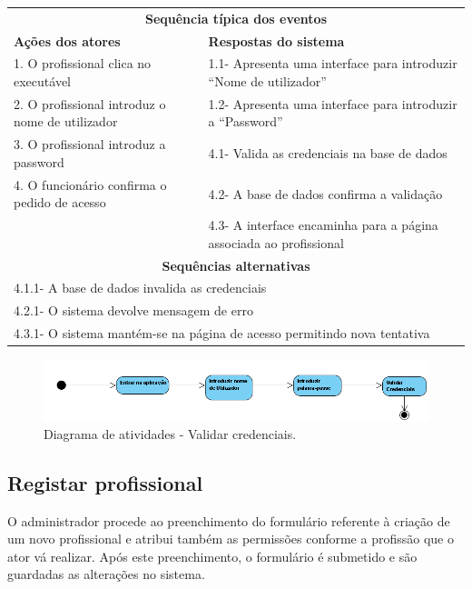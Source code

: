 \documentclass[11pt,a4paper,twoside]{report}
\begin{document}
\begin{center}
\begin{tabularx}{\textwidth}{|lX|}
	\hline
	\multicolumn{2}{|c|}{\textbf{Sequência típica dos eventos} }\\
\setlength{\tabcolsep}{12pt}
\textbf{Ações dos atores}  & \textbf{Respostas do sistema} \\
1. O profissional clica no executável & 1.1-     Apresenta uma interface para introduzir “Nome de utilizador” \\
2.     O profissional introduz o nome de utilizador & 1.2-    Apresenta uma interface para introduzir a “Password”  \\
3.    O profissional introduz a password & 4.1- Valida as credenciais na base de dados \\
4.    O funcionário confirma o pedido de acesso & 4.2- A base de dados confirma a validação \\
	& 4.3- A interface encaminha para a página associada ao profissional \\
	\hline
\multicolumn{2}{|c|}{\textbf{Sequências alternativas } }\\
\hline
\multicolumn{2}{|l|}{4.1.1- A base de dados invalida as credenciais   }\\
\multicolumn{2}{|l|}{4.2.1- O sistema devolve mensagem de erro    }\\
\multicolumn{2}{|l|}{4.3.1- O sistema mantém-se na página de acesso permitindo nova tentativa   }\\ \hline
\end{tabularx}

\end{center}

\begin{figure}[H]
	\centering
	\includegraphics[width=0.7\linewidth]{image/Atividades/Validar Credenciais}
	\caption{Diagrama de atividades - Validar credenciais.}
	\label{fig:validarcredenciais}
\end{figure}



\subsection{Registar profissional }

O administrador procede ao preenchimento do formulário referente à criação de um novo profissional e atribui também as permissões conforme a profissão que o ator vá realizar. Após este preenchimento, o formulário é submetido e são guardadas as alterações no sistema. 
\end{document}
